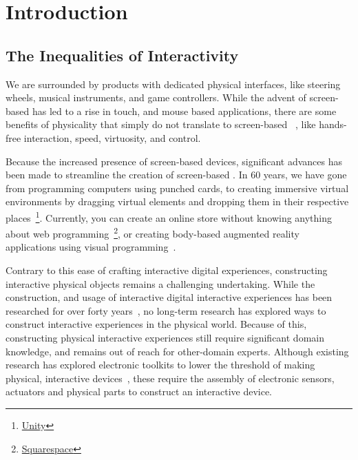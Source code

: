 \chapter{Introduction}
  \section{The Inequalities of Interactivity}
    We are surrounded by products with dedicated physical interfaces, like
    steering wheels, musical instruments, and game controllers. While the advent
    of screen-based  has led to a rise in touch, and mouse based
    applications, there are some benefits of physicality that simply do not
    translate to screen-based ~\cite{klemmer:2006}, like
    hands-free interaction, speed, virtuosity, and control. 

    Because the increased presence of screen-based devices, significant advances
    has been made to streamline the creation of screen-based .  In 60 years, we have gone from programming computers using
    punched cards, to creating immersive virtual environments by dragging
    virtual elements and dropping them in their respective
    places~\footnote{\href{https://unity.com}{Unity}}.  Currently, you can
    create an online store without knowing anything about web
    programming~\footnote{\href{https://www.squarespace.com}{Squarespace}}, or
    creating body-based augmented reality applications using visual
    programming~\cite{Pohl:2020}.

    Contrary to this ease of crafting interactive digital experiences,
    constructing interactive physical objects remains a challenging
    undertaking. While the construction, and usage of interactive digital
    interactive experiences has been researched for over forty
    years~\cite{CHI:, UIST:}, no long-term research has explored ways to
    construct interactive experiences in the physical world. Because of this,
    constructing physical interactive experiences still require significant
    domain knowledge, and remains out of reach for other-domain experts. Although
    existing research has explored electronic toolkits to lower the threshold of
    making physical, interactive devices~\cite{Greenberg:2001, Arduino:}, these
    require the assembly of electronic sensors, actuators and physical parts to
    construct an interactive device.

